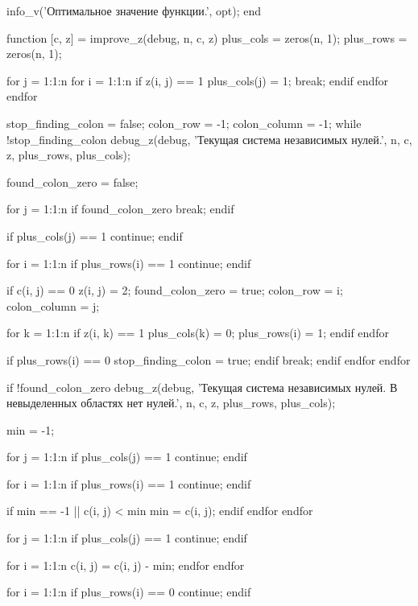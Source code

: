  info_v('Оптимальное значение функции.', opt);
end

function [c, z] = improve_z(debug, n, c, z)
  plus_cols = zeros(n, 1);
  plus_rows = zeros(n, 1);

  for j = 1:1:n
    for i = 1:1:n
      if z(i, j) == 1
        plus_cols(j) = 1;
        break;
      endif
    endfor
  endfor

  stop_finding_colon = false;
  colon_row = -1;
  colon_column = -1;
  while !stop_finding_colon
    debug_z(debug, 'Текущая система независимых нулей.', n, c, z, plus_rows, plus_cols);

    found_colon_zero = false;

    for j = 1:1:n
      if found_colon_zero
        break;
      endif

      if plus_cols(j) == 1
        continue;
      endif

      for i = 1:1:n
        if plus_rows(i) == 1
          continue;
        endif

        if c(i, j) == 0
          z(i, j) = 2;
          found_colon_zero = true;
          colon_row = i;
          colon_column = j;

          for k = 1:1:n
            if z(i, k) == 1
              plus_cols(k) = 0;
              plus_rows(i) = 1;
            endif
          endfor

          if plus_rows(i) == 0
            stop_finding_colon = true;
          endif
          break;
        endif
      endfor
    endfor

    if !found_colon_zero
      debug_z(debug, 'Текущая система независимых нулей. В невыделенных областях нет нулей.', n, c, z, plus_rows, plus_cols);

      min = -1;

      for j = 1:1:n
        if plus_cols(j) == 1
          continue;
        endif

        for i = 1:1:n
          if plus_rows(i) == 1
            continue;
          endif

          if min == -1 || c(i, j) < min
            min = c(i, j);
          endif
        endfor
      endfor

      for j = 1:1:n
        if plus_cols(j) == 1
          continue;
        endif

        for i = 1:1:n
          c(i, j) = c(i, j) - min;
        endfor
      endfor

      for i = 1:1:n
        if plus_rows(i) == 0
          continue;
        endif

